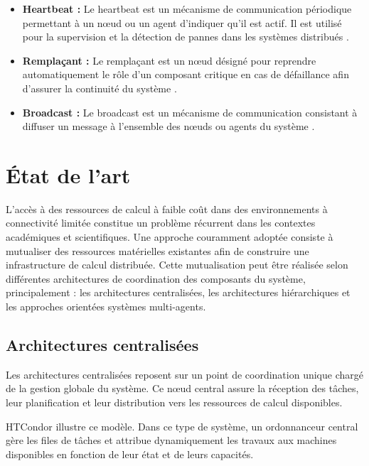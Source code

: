 \documentclass[12pt,a4paper]{report}
\begin{document}
\begin{itemize}
    \item[$\bullet$] \textbf{Heartbeat :} Le heartbeat est un mécanisme de communication périodique permettant à un nœud ou un agent d'indiquer qu'il est actif. Il est utilisé pour la supervision et la détection de pannes dans les systèmes distribués \cite{tanenbaum_ds, kubernetes}.

    \item[$\bullet$] \textbf{Remplaçant :} Le remplaçant est un nœud désigné pour reprendre automatiquement le rôle d'un composant critique en cas de défaillance afin d'assurer la continuité du système \cite{bully}.

    \item[$\bullet$] \textbf{Broadcast :} Le broadcast est un mécanisme de communication consistant à diffuser un message à l'ensemble des nœuds ou agents du système \cite{tanenbaum_ds}.

\end{itemize}

\section{État de l'art}

L'accès à des ressources de calcul à faible coût dans des environnements à connectivité limitée constitue un problème récurrent dans les contextes académiques et scientifiques. Une approche couramment adoptée consiste à mutualiser des ressources matérielles existantes afin de construire une infrastructure de calcul distribuée. Cette mutualisation peut être réalisée selon différentes architectures de coordination des composants du système, principalement : les architectures centralisées, les architectures hiérarchiques et les approches orientées systèmes multi-agents.

\subsection{Architectures centralisées}

Les architectures centralisées reposent sur un point de coordination unique chargé de la gestion globale du système. Ce nœud central assure la réception des tâches, leur planification et leur distribution vers les ressources de calcul disponibles.

HTCondor illustre ce modèle. Dans ce type de système, un ordonnanceur central gère les files de tâches et attribue dynamiquement les travaux aux machines disponibles en fonction de leur état et de leurs capacités.
\end{document}
